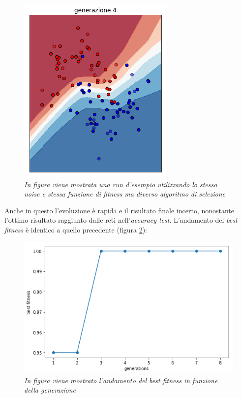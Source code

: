 \documentclass[12pt,a4paper]{report}
\begin{document}
\begin{figure}[H]
 \includegraphics[scale = 0.3]{images/moons-sons-acc./4}
 \caption{\textit{In figura viene mostrata una run d'esempio utilizzando lo stesso noise e stessa funzione di fitness ma diverso algoritmo di selezione}}
 \label{moons2}
\end{figure}

Anche in questo l'evoluzione è rapida e il risultato finale incerto, nonostante l'ottimo risultato raggiunto dalle reti nell'\textit{accuracy test}. L'andamento del \textit{best fitness} è identico a quello precedente (figura \ref{best2}):

\begin{figure}[H]
 \centering
 \includegraphics[scale = 0.4]{images/moons-sons-acc./best}
 \caption{\textit{In figura viene mostrato l'andamento del best fitness in funzione della generazione}}
 \label{best2}
\end{figure}
\end{document}
